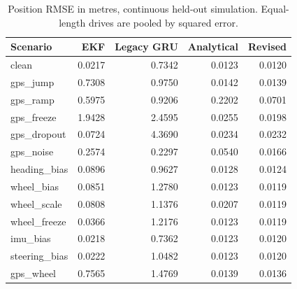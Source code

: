 \begin{table}[htbp]\centering\small
\begin{tabular}{lrrrr}\toprule
Scenario & EKF & Legacy GRU & Analytical & Revised \\\midrule
clean & 0.0217 & 0.7342 & 0.0123 & 0.0120 \\
gps\_jump & 0.7308 & 0.9750 & 0.0142 & 0.0139 \\
gps\_ramp & 0.5975 & 0.9206 & 0.2202 & 0.0701 \\
gps\_freeze & 1.9428 & 2.4595 & 0.0255 & 0.0198 \\
gps\_dropout & 0.0724 & 4.3690 & 0.0234 & 0.0232 \\
gps\_noise & 0.2574 & 0.2297 & 0.0540 & 0.0166 \\
heading\_bias & 0.0896 & 0.9627 & 0.0128 & 0.0124 \\
wheel\_bias & 0.0851 & 1.2780 & 0.0123 & 0.0119 \\
wheel\_scale & 0.0808 & 1.1376 & 0.0207 & 0.0119 \\
wheel\_freeze & 0.0366 & 1.2176 & 0.0123 & 0.0119 \\
imu\_bias & 0.0218 & 0.7362 & 0.0123 & 0.0120 \\
steering\_bias & 0.0222 & 1.0482 & 0.0123 & 0.0120 \\
gps\_wheel & 0.7565 & 1.4769 & 0.0139 & 0.0136 \\
\bottomrule\end{tabular}
\caption{Position RMSE in metres, continuous held-out simulation. Equal-length drives are pooled by squared error.}\end{table}